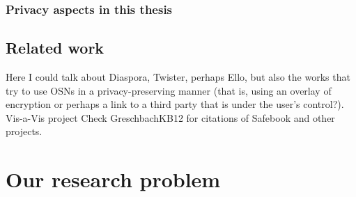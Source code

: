 \documentclass[showtrims,oldfontcommands]{kthesis}
\begin{document}
%
%
%
%

\subsection{Privacy aspects in this thesis}
    \label{subsection:privacy-aspects-in-this-thesis}


\section{Related work}
    \label{section:related-work}


Here I could talk about Diaspora, Twister, perhaps Ello, but also the works that try to 
use OSNs in a privacy-preserving manner (that is, using an overlay of encryption 
or perhaps a link to a third party that is under the user's control?).
Vis-a-Vis project
Check GreschbachKB12 for citations of Safebook and other projects.



\chapter{Our research problem}
    \label{chapter:our-research-problem}

\end{document}
